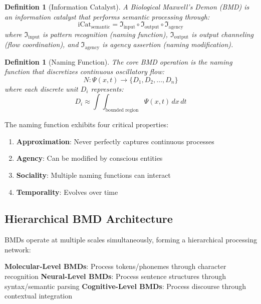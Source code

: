\documentclass[11pt,twocolumn]{article}
\newtheorem{definition}[theorem]{Definition}
\theoremstyle{remark}
\begin{document}
\begin{definition}[Information Catalyst]
A Biological Maxwell's Demon (BMD) is an information catalyst that performs semantic processing through:
\begin{equation}
\text{iCat}_{\text{semantic}} = \mathfrak{I}_{\text{input}} \circ \mathfrak{I}_{\text{output}} \circ \mathfrak{I}_{\text{agency}}
\end{equation}
where $\mathfrak{I}_{\text{input}}$ is pattern recognition (naming function), $\mathfrak{I}_{\text{output}}$ is output channeling (flow coordination), and $\mathfrak{I}_{\text{agency}}$ is agency assertion (naming modification).
\end{definition}

\begin{definition}[Naming Function]
The core BMD operation is the naming function that discretizes continuous oscillatory flow:
\begin{equation}
N: \Psi(x,t) \rightarrow \{D_1, D_2, \ldots, D_n\}
\end{equation}
where each discrete unit $D_i$ represents:
\begin{equation}
D_i \approx \int\int_{\text{bounded region}} \Psi(x,t) \, dx \, dt
\end{equation}
\end{definition}

The naming function exhibits four critical properties:
\begin{enumerate}
\item \textbf{Approximation}: Never perfectly captures continuous processes
\item \textbf{Agency}: Can be modified by conscious entities
\item \textbf{Sociality}: Multiple naming functions can interact
\item \textbf{Temporality}: Evolves over time
\end{enumerate}

\subsection{Hierarchical BMD Architecture}

BMDs operate at multiple scales simultaneously, forming a hierarchical processing network:

\textbf{Molecular-Level BMDs}: Process tokens/phonemes through character recognition
\textbf{Neural-Level BMDs}: Process sentence structures through syntax/semantic parsing
\textbf{Cognitive-Level BMDs}: Process discourse through contextual integration
\end{document}
